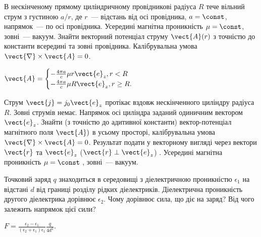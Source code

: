 \begin{problem}
В нескінченому прямому циліндричному провідникові радіуса $R$ тече вільний струм з густиною $a/r$, де $r$~--- відстань від осі провідника, $a = \const$, напрямок~--- по осі провідника. Усередині магнітна проникність $\mu = \const$, зовні~--- вакуум. Знайти векторний потенціал струму $\vect{A}(r)$  з точністю до константи всередині та зовні провідника. Калібрувальна умова $\vect{\nabla}\times\vect{A} = 0$.
\begin{solution}
	$\vect{A} =
		\begin{cases}
			-\frac{4\pi a}{c}\mu r \vect{e}_z, r < R \\
			-\frac{4\pi a}{c}\mu R \vect{e}_z, r \ge R.
		\end{cases}
	$
\end{solution}
\end{problem}

\begin{problem}
Струм  $\vect{j} = j_0 \vect{e}_z$ протікає вздовж нескінченного циліндру радіуса $R$. Зовні струмів немає. Напрямок осі циліндра заданий одиничним вектором  $\vect{e}_z$. Знайти (з точністю до адитивної константи) вектор-потенціал магнітного поля $\vect{A})$  в усьому просторі, калібрувальна умова $\vect{\nabla}\times\vect{A} = 0$. Результат подати у векторному вигляді через вектори $\vect{r}$ та $\vect{e}_z$ ($\vect{r} \perp \vect{e}_z$) . Усередині магнітна проникність $\mu = \const$  , зовні~--- вакуум.
\end{problem}

\begin{problem}
Точковий заряд $q$ знаходиться в середовищі з діелектричною проникністю $\epsilon_1$ на відстані $d$ від границі розділу рідких діелектриків. Діелектрична проникність другого діелектрика дорівнює $\epsilon_2$. Чому дорівнює сила, що діє на заряд? Від чого залежить напрямок цієї сили?
\begin{solution}
	$F = \frac{\epsilon_2 - \epsilon_1}{(\epsilon_2 + \epsilon_1)\epsilon_1} \frac{q}{4d^2}$.
\end{solution}
\end{problem}

